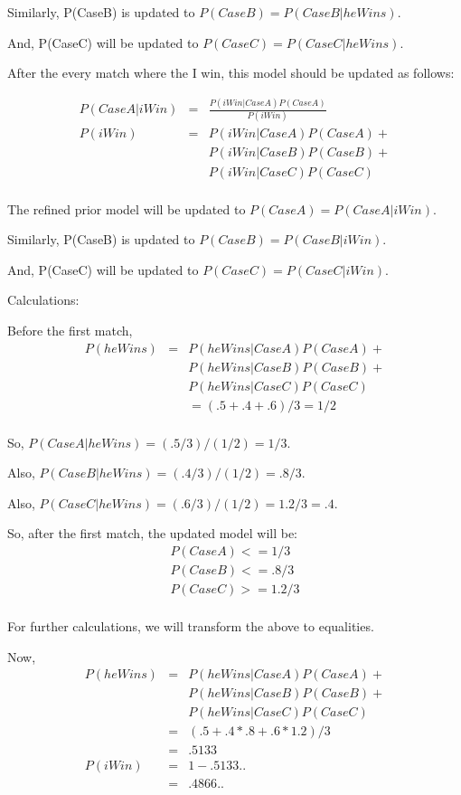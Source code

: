 \documentclass[10pt]{article}
\begin{document}
Similarly, P(CaseB) is updated to $P(CaseB)=P(CaseB|heWins)$.

And, P(CaseC) will be updated to $P(CaseC)=P(CaseC|heWins)$.

After the every match where the I win, this model should be updated as follows:

\begin{eqnarray}
P(CaseA|iWin)&=&\frac{P(iWin|CaseA)P(CaseA)}{P(iWin)}\\
P(iWin)&=&P(iWin|CaseA)P(CaseA)+\\
&&P(iWin|CaseB)P(CaseB)+\\
&&P(iWin|CaseC)P(CaseC)\\
\end{eqnarray}

The refined prior model will be updated to $P(CaseA)=P(CaseA|iWin)$.

Similarly, P(CaseB) is updated to $P(CaseB)=P(CaseB|iWin)$.

And, P(CaseC) will be updated to $P(CaseC)=P(CaseC|iWin)$.

Calculations:

Before the first match, 
\begin{eqnarray}
P(heWins) &=& P(heWins|CaseA)P(CaseA)+\\
&&P(heWins|CaseB)P(CaseB)+\\
&&P(heWins|CaseC)P(CaseC)\\
&&=(.5+.4+.6)/3 = 1/2\\
\end{eqnarray}

So, $P(CaseA|heWins) = (.5/3)/(1/2) = 1/3$.

Also, $P(CaseB|heWins) = (.4/3)/(1/2)= .8/3$.

Also, $P(CaseC|heWins) = (.6/3)/(1/2)= 1.2/3=.4$.

So, after the first match, the updated model will be: 
\begin{eqnarray}
P(CaseA) <= 1/3\\
P(CaseB) <= .8/3\\
P(CaseC) >= 1.2/3\\
\end{eqnarray}

For further calculations, we will transform the above to equalities.

Now,
\begin{eqnarray}
P(heWins) &=& P(heWins|CaseA)P(CaseA)+\\
&&P(heWins|CaseB)P(CaseB)+\\
&&P(heWins|CaseC)P(CaseC)\\
&=&(.5+.4*.8+.6*1.2)/3\\
&=&.5133\\
P(iWin)&=&1-.5133..\\
&=&.4866..\\
\end{eqnarray}
\end{document}

